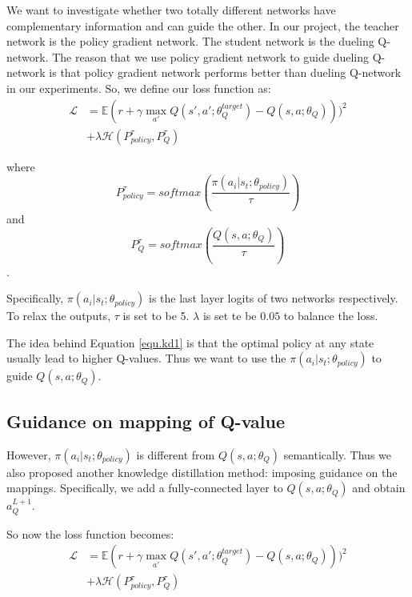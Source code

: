 %
We want to investigate whether two totally different networks have complementary information and can guide the other.
%
In our project, the teacher network is the policy gradient network. The student network is the dueling Q-network. The reason that we use policy gradient network to guide dueling Q-network is that policy gradient network performs better than dueling Q-network in our experiments.
%
So, we define our loss function as:
\begin{equation}
\begin{split}
\mathcal{L} &= \mathbb{E}(r+\gamma \max_{a'}Q(s',a';\theta^{target}_{Q})-Q(s,a;\theta_{Q})))^2  \\
& + \lambda\mathcal{H} ( P^{\tau}_{policy},P^{\tau}_{Q} )
\end{split}
\label{equ.kd1}
\end{equation}

\noindent
where 
$$P^{\tau}_{policy} = softmax(\frac{\pi(a_i|s_t;\theta_{policy})}{\tau})$$
and  
$$P^{\tau}_{Q} = softmax( \frac{Q(s,a;\theta_{Q})} {\tau} )$$.

\noindent
Specifically, $\pi(a_i|s_t;\theta_{policy})$ is the last layer logits of two networks respectively. To relax the outputs, $\tau$ is set to be 5. $\lambda$ is set te be $0.05$ to balance the loss.

The idea behind Equation \ref{equ.kd1} is that the optimal policy at any state usually lead to higher Q-values. Thus we want to use the $\pi(a_i|s_t;\theta_{policy})$ to guide $Q(s,a;\theta_{Q})$.

\subsection{Guidance on mapping of Q-value}
However,  $\pi(a_i|s_t;\theta_{policy})$ is different from $Q(s,a;\theta_{Q})$ semantically. Thus we also proposed another knowledge distillation method: imposing guidance on the mappings.
%
Specifically, we add a fully-connected layer to $Q(s,a;\theta_{Q})$ and obtain  $a^{L+1}_{Q}$.

So now the loss function becomes:
\begin{equation}
\begin{split}
\mathcal{L} &= \mathbb{E}(r+\gamma \max_{a'}Q(s',a';\theta^{target}_{Q})-Q(s,a;\theta_{Q})))^2  \\
& + \lambda\mathcal{H} ( P^{\tau}_{policy},P^{\tau}_{Q} )
\end{split}
\label{equ.kd}
\end{equation}

